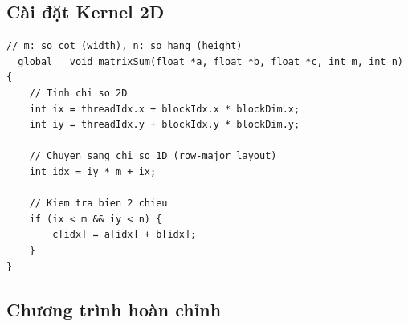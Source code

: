 \subsection{Cài đặt Kernel 2D}

\begin{lstlisting}[caption={Matrix Sum Kernel với Block 2D}, label={lst:matrix_sum_kernel}]
// m: so cot (width), n: so hang (height)
__global__ void matrixSum(float *a, float *b, float *c, int m, int n) {
    // Tinh chi so 2D
    int ix = threadIdx.x + blockIdx.x * blockDim.x;
    int iy = threadIdx.y + blockIdx.y * blockDim.y;
    
    // Chuyen sang chi so 1D (row-major layout)
    int idx = iy * m + ix;

    // Kiem tra bien 2 chieu
    if (ix < m && iy < n) {
        c[idx] = a[idx] + b[idx];
    }
}
\end{lstlisting}

\subsection{Chương trình hoàn chỉnh}

